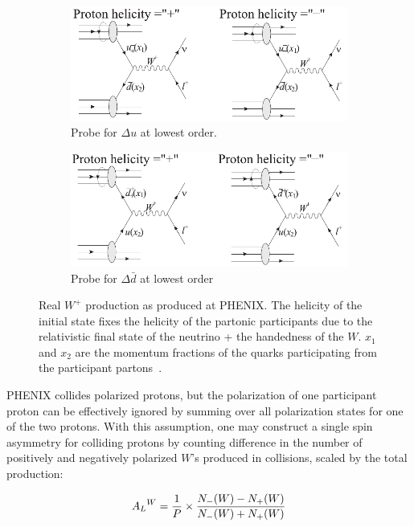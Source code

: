 \begin{figure}[ht]
  \centering
  \begin{subfigure}[b]{\textwidth}
    \centering
    \includegraphics[width=0.8\linewidth]{./figures/w_plus_u_probe.pdf}
    \caption{
      Probe for $\Delta u$ at lowest order.
    }
    \label{fig:u_probe}
  \end{subfigure}
  \begin{subfigure}[t]{\textwidth}
    \centering
    \includegraphics[width=0.8\linewidth]{./figures/w_plus_dbar_probe.pdf}
    \caption{
      Probe for $\Delta\bar{d}$ at lowest order
    }
    \label{fig:dbar_probe}
  \end{subfigure}
  \caption{
    Real $W^+$ production as produced at PHENIX. The helicity of the initial
    state fixes the helicity of the partonic participants due to the
    relativistic final state of the neutrino + the handedness of the $W$.  $x_1$
    and $x_2$ are the momentum fractions of the quarks participating from the
    participant partons~\cite{Aidala2005}. 
  }
  \label{fig:w_probe_leading_order}
\end{figure}

PHENIX collides polarized protons, but the polarization of one participant
proton can be effectively ignored by summing over all polarization states for
one of the two protons. With this assumption, one may construct a single spin
asymmetry for colliding protons by counting difference in the number of
positively and negatively polarized $W$'s produced in collisions, scaled by the
total production:

\begin{equation}
  {{A_L}^W} =
  {{{1}\over{P}}\times{{N_{-}(W)-N_{+}(W)}\over{{N_{-}(W)+N_{+}(W)}}} }
  \label{eq:w_production_asymmetry}
\end{equation}

